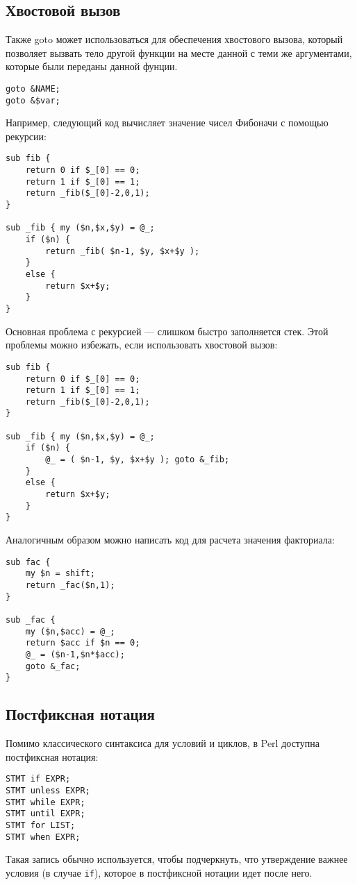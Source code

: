 \subsection{Хвостовой вызов}
Также goto может использоваться для обеспечения хвостового вызова, который позволяет вызвать тело другой функции на месте данной с теми же аргументами, которые были переданы данной фунции.
\begin{verbatim}
goto &NAME;
goto &$var;
\end{verbatim}
Например, следующий код вычисляет значение чисел Фибоначи с помощью рекурсии:
\begin{verbatim}
sub fib {
    return 0 if $_[0] == 0;
    return 1 if $_[0] == 1;
    return _fib($_[0]-2,0,1);
}

sub _fib { my ($n,$x,$y) = @_;
    if ($n) {
        return _fib( $n-1, $y, $x+$y );
    }
    else {
        return $x+$y;
    }
}
\end{verbatim}
Основная проблема с рекурсией --- слишком быстро заполняется стек. Этой проблемы можно избежать, если использовать хвостовой вызов:
\begin{verbatim}
sub fib {
    return 0 if $_[0] == 0;
    return 1 if $_[0] == 1;
    return _fib($_[0]-2,0,1);
}

sub _fib { my ($n,$x,$y) = @_;
    if ($n) {
        @_ = ( $n-1, $y, $x+$y ); goto &_fib;
    }
    else {
        return $x+$y;
    }
}
\end{verbatim}
Аналогичным образом можно написать код для расчета значения факториала:
\begin{verbatim}
sub fac {
    my $n = shift;
    return _fac($n,1);
}

sub _fac {
    my ($n,$acc) = @_;
    return $acc if $n == 0;
    @_ = ($n-1,$n*$acc);
    goto &_fac;
}
\end{verbatim}

\subsection{Постфиксная нотация}
Помимо классического синтаксиса для условий и циклов, в Perl доступна постфиксная нотация:
\begin{verbatim}
STMT if EXPR;
STMT unless EXPR;
STMT while EXPR;
STMT until EXPR;
STMT for LIST;
STMT when EXPR;
\end{verbatim}
Такая запись обычно используется, чтобы подчеркнуть, что утверждение важнее условия (в случае \verb|if|), которое в постфиксной нотации идет после него.

